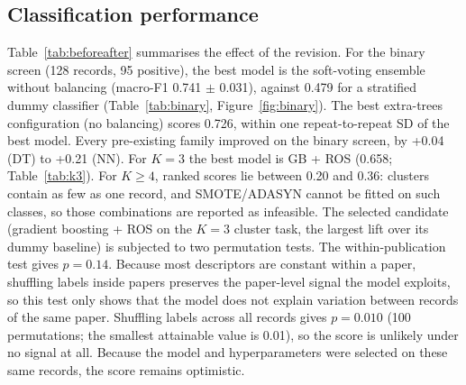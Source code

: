 \documentclass[11pt,a4paper]{article}
\begin{document}
\subsection{Classification performance}
Table~\ref{tab:beforeafter} summarises the effect of the revision. For the binary screen (128 records, 95 positive), the best model is the soft-voting ensemble without balancing (macro-F1 0.741 $\pm$ 0.031), against 0.479 for a stratified dummy classifier (Table~\ref{tab:binary}, Figure~\ref{fig:binary}). The best extra-trees configuration (no balancing) scores 0.726, within one repeat-to-repeat SD of the best model. Every pre-existing family improved on the binary screen, by +0.04 (DT) to +0.21 (NN). For $K=3$ the best model is GB + ROS (0.658; Table~\ref{tab:k3}). For $K\geq4$, ranked scores lie between 0.20 and 0.36: clusters contain as few as one record, and SMOTE/ADASYN cannot be fitted on such classes, so those combinations are reported as infeasible. The selected candidate (gradient boosting + ROS on the $K=3$ cluster task, the largest lift over its dummy baseline) is subjected to two permutation tests. The within-publication test gives $p=0.14$. Because most descriptors are constant within a paper, shuffling labels inside papers preserves the paper-level signal the model exploits, so this test only shows that the model does not explain variation between records of the same paper. Shuffling labels across all records gives $p=0.010$ (100 permutations; the smallest attainable value is 0.01), so the score is unlikely under no signal at all. Because the model and hyperparameters were selected on these same records, the score remains optimistic. 
\end{document}
